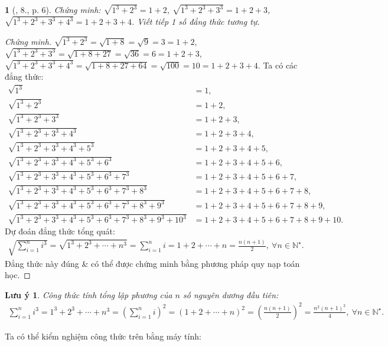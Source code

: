 \documentclass{article}
\newtheorem{baitoan}{}%
\newtheorem{luuy}{Lưu ý}
\begin{document}
\begin{baitoan}[\cite{SBT_Toan_9_tap_1}, 8., p. 6]
	Chứng minh: $\sqrt{1^3 + 2^3} = 1 + 2$, $\sqrt{1^3 + 2^3 + 3^3} = 1 + 2 + 3$, $\sqrt{1^3 + 2^3 + 3^3 + 4^3} = 1 + 2 + 3 + 4$. Viết tiếp 1 số đẳng thức tương tự. 
\end{baitoan}

\begin{proof}[Chứng minh]
	$\sqrt{1^3 + 2^3} = \sqrt{1 + 8} = \sqrt{9} = 3 = 1 + 2$, $\sqrt{1^3 + 2^3 + 3^3} = \sqrt{1 + 8 + 27} = \sqrt{36} = 6 = 1 + 2 + 3$, $\sqrt{1^3 + 2^3 + 3^3 + 4^3} = \sqrt{1 + 8 + 27 + 64} = \sqrt{100} = 10 = 1 + 2 + 3 + 4$. Ta có các đẳng thức:
	\begin{align*}
		\sqrt{1^3} &= 1,\\
		\sqrt{1^3 + 2^3} &= 1 + 2,\\
		\sqrt{1^3 + 2^3 + 3^3} &= 1 + 2 + 3,\\
		\sqrt{1^3 + 2^3 + 3^3 + 4^3} &= 1 + 2 + 3 + 4,\\
		\sqrt{1^3 + 2^3 + 3^3 + 4^3 + 5^3} &= 1 + 2 + 3 + 4 + 5,\\
		\sqrt{1^3 + 2^3 + 3^3 + 4^3 + 5^3 + 6^3} &= 1 + 2 + 3 + 4 + 5 + 6,\\
		\sqrt{1^3 + 2^3 + 3^3 + 4^3 + 5^3 + 6^3 + 7^3} &= 1 + 2 + 3 + 4 + 5 + 6 + 7,\\
		\sqrt{1^3 + 2^3 + 3^3 + 4^3 + 5^3 + 6^3 + 7^3 + 8^3} &= 1 + 2 + 3 + 4 + 5 + 6 + 7 + 8,\\
		\sqrt{1^3 + 2^3 + 3^3 + 4^3 + 5^3 + 6^3 + 7^3 + 8^3 + 9^3} &= 1 + 2 + 3 + 4 + 5 + 6 + 7 + 8 + 9,\\
		\sqrt{1^3 + 2^3 + 3^3 + 4^3 + 5^3 + 6^3 + 7^3 + 8^3 + 9^3 + 10^3} &= 1 + 2 + 3 + 4 + 5 + 6 + 7 + 8 + 9 + 10.
	\end{align*}
	Dự đoán đẳng thức tổng quát:
	\begin{align*}
		\sqrt{\sum_{i=1}^n i^3} = \sqrt{1^3 + 2^3 + \cdots + n^3} = \sum_{i=1}^n i = 1 + 2 + \cdots + n = \frac{n(n + 1)}{2},\ \forall n\in\mathbb{N}^\star.
	\end{align*}
	Đẳng thức này đúng \& có thể được chứng minh bằng phương pháp quy nạp toán học.
\end{proof}

\begin{luuy}
	Công thức tính tổng lập phương của $n$ số nguyên dương đầu tiên:
	\begin{align}
		\label{sum of 1st n cubes}
		\sum_{i=1}^n i^3 = 1^3 + 2^3 + \cdots + n^3 = \left(\sum_{i=1}^n i\right)^2 = (1 + 2 + \cdots + n)^2 = \left(\frac{n(n + 1)}{2}\right)^2 = \frac{n^2(n + 1)^2}{4},\ \forall n\in\mathbb{N}^\star.
	\end{align}
\end{luuy}
Ta có thể kiểm nghiệm công thức trên bằng máy tính:
\end{document}
